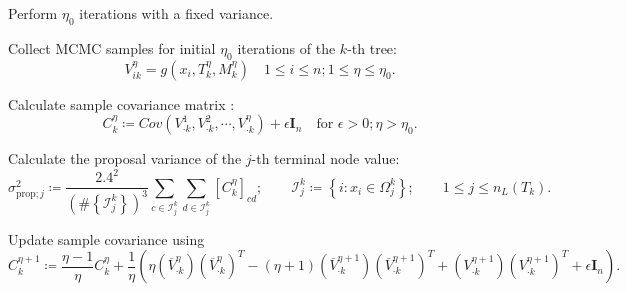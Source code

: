 \documentclass[
12pt]{article}
\begin{document}
	
	\begin{algorithm}[h]
		\caption{Computation of adaptive proposal}\label{alg:ada:prop}
		\begin{algorithmic}[1]
			\State Perform $\eta_0$ iterations with a fixed variance.
			
			\State Collect MCMC samples for initial $\eta_0$ iterations of the $k$-th tree:
			\begin{equation*}
				V_{ik}^{\eta} = g\left(x_i,T_k^{\eta},M_k^{\eta}\right)\quad 1\le i \le n; 1\le \eta \le \eta_0.
			\end{equation*}
			
			\State Calculate sample covariance matrix :
			\begin{equation*}
				C_k^{\eta} \coloneqq Cov\left(V_{\cdot k}^{1},V_{\cdot k}^{2},\cdots,V_{\cdot k}^{\eta}\right) + \epsilon\mathbf{I}_n \quad \text{for } \epsilon>0; \eta>\eta_0.
			\end{equation*}
			
			\State Calculate the proposal variance of the $j$-th terminal node value:
			\begin{equation*}
				\sigma_{\text{prop};j}^2 \coloneqq \frac{2.4^2}{\left(\#\left\{\mathcal{I}_{j}^{k}\right\}\right)^3}
				\sum_{c\in\mathcal{I}_{j}^{k}}\sum_{d\in\mathcal{I}_{j}^{k}}\left[C_k^{\eta}\right]_{cd};\qquad\mathcal{I}_{j}^{k}\coloneqq \left\{i:x_i\in \Omega_{j}^{k}\right\};\qquad 1\le j\le n_L(T_k).
			\end{equation*}
			
			\EndFor
			
			\State Update sample covariance using 
			\begin{equation*}
				C_k^{\eta+1} \coloneqq 
				\frac{\eta-1}{\eta} C_k^{\eta} 
				+ \frac{1}{\eta}\left(\eta 
				\left(\overline{V}_{\cdot k}^{\eta}\right)\left(\overline{V}_{\cdot k}^{\eta}\right)^T 
				- (\eta+1)\left(\overline{V}_{\cdot k}^{\eta+1}\right)\left(\overline{V}_{\cdot k}^{\eta+1}\right)^T 
				+ \left({V}_{\cdot k}^{\eta+1}\right)\left({V}_{\cdot k}^{\eta+1}\right)^T + \epsilon\mathbf{I}_n\right).
			\end{equation*}
		\end{algorithmic}
	\end{algorithm}
	
\end{document}

